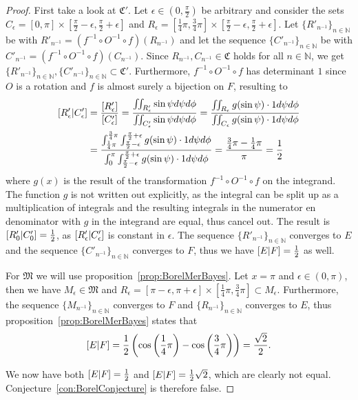 \documentclass[twoside,a4paper]{report}
\theoremstyle{plain}
\theoremstyle{definition}
\theoremstyle{remark}
\numberwithin{equation}{chapter}
\newcommand{\N}{\mathbb{N}}
\let\P\relax
\DeclareMathOperator{\P}{\mathbb{P}}
\DeclareMathOperator{\1}{\mathbbm{1}}
\begin{document}
\begin{proof}
First take a look at $\mathfrak{C}'$. Let $\epsilon\in\left(0,\frac{\pi}{2}\right)$ be arbitrary and consider the sets $C_\epsilon=[0,\pi]\times\left[\frac{\pi}{2}-\epsilon,\frac{\pi}{2}+\epsilon\right]$ and $R_\epsilon=\left[\frac{1}{4}\pi,\frac{3}{4}\pi\right]\times\left[\frac{\pi}{2}-\epsilon,\frac{\pi}{2}+\epsilon\right]$. Let $\{R'_{n^{-1}}\}_{n\in\N}$ be with $R'_{n^{-1}}=(f^{-1}\circ O^{-1}\circ f)(R_{n^{-1}})$ and let the sequence $\{C'_{n^{-1}}\}_{n\in\N}$ be with $C'_{n^{-1}}=(f^{-1}\circ O^{-1}\circ f)(C_{n^{-1}})$. Since $R_{n^{-1}},C_{n^{-1}}\in\mathfrak{C}$ holds for all $n\in\N$, we get $\{R'_{n^{-1}}\}_{n\in\N},\{C'_{n^{-1}}\}_{n\in\N}\subset\mathfrak{C'}$. Furthermore, $f^{-1}\circ O^{-1}\circ f$ has determinant $1$ since $O$ is a rotation and $f$ is almost surely a bijection on $F$, resulting to
\begin{align}
\P[R'_\epsilon|C'_\epsilon]&=\frac{\P[R'_\epsilon]}{\P[C'_\epsilon]}=\frac{\iint_{R'_\epsilon}\sin\psi d\psi d\phi}{\iint_{C'_\epsilon} \sin\psi d\psi d\phi}=\frac{\iint_{R_\epsilon}g(\sin\psi)\cdot1 d\psi d\phi}{\iint_{C_\epsilon}g(\sin\psi)\cdot1d\psi d\phi}\\
&=\frac{\int_{\frac{1}{4}\pi}^{\frac{3}{4}\pi}\int_{\frac{\pi}{2}-\epsilon}^{\frac{\pi}{2}+\epsilon}g(\sin\psi)\cdot1 d\psi d\phi}{\int_{0}^{\pi}\int_{\frac{\pi}{2}-\epsilon}^{\frac{\pi}{2}+\epsilon}g(\sin\psi)\cdot1d\psi d\phi}=\frac{\frac{3}{4}\pi-\frac{1}{4}\pi}{\pi}=\frac{1}{2}
\end{align}
where $g(x)$ is the result of the transformation $f^{-1}\circ O^{-1}\circ f$ on the integrand. The function $g$ is not written out explicitly, as the integral can be split up as a multiplication of integrals and the resulting integrals in the numerator en denominator with $g$ in the integrand are equal, thus cancel out. The result is $\P[R'_0|C'_0]=\frac{1}{2}$, as $\P[R'_\epsilon|C'_\epsilon]$ is constant in $\epsilon$. The sequence $\{R'_{n^{-1}}\}_{n\in\N}$ converges to $E$ and the sequence $\{C'_{n^{-1}}\}_{n\in\N}$ converges to $F$, thus we have $\P[E|F]=\frac{1}{2}$ as well.

For $\mathfrak{M}$ we will use proposition~\ref{prop:BorelMerBayes}. Let $x=\pi$ and $\epsilon\in(0,\pi)$, then we have $M_\epsilon\in\mathfrak{M}$ and $R_\epsilon=[\pi-\epsilon,\pi+\epsilon]\times\left[\frac{1}{4}\pi,\frac{3}{4}\pi\right]\subset M_\epsilon$. Furthermore, the sequence $\{M_{n^{-1}}\}_{n\in\N}$ converges to $F$ and $\{R_{n^{-1}}\}_{n\in\N}$ converges to $E$, thus proposition~\ref{prop:BorelMerBayes} states that
\begin{equation}
\P[E|F]=\frac{1}{2}\left(\cos\left(\frac{1}{4}\pi\right)-\cos\left(\frac{3}{4}\pi\right)\right)=\frac{\sqrt{2}}{2}.
\end{equation}

We now have both $\P[E|F]=\frac{1}{2}$ and $\P[E|F]=\frac{1}{2}\sqrt{2}$, which are clearly not equal. Conjecture~\ref{con:BorelConjecture} is therefore false.
\end{proof}
\end{document}
